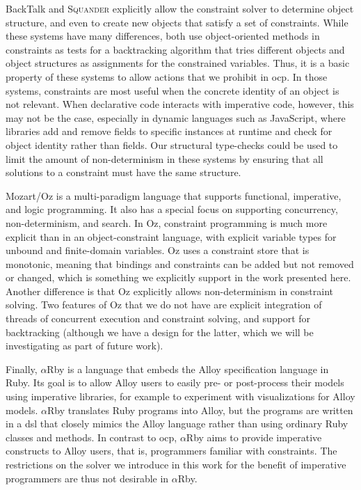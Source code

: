 \documentclass[10pt,reprint]{sigplanconf-preprint}
\newcommand{\ac}[1]{\gls*{#1}}
\begin{document}
BackTalk \cite{pachet1995,roy2000framework} and \textsc{Squander}
\cite{Squander} explicitly allow the constraint solver to determine
object structure, and even to create new objects that satisfy a set of
constraints. While these systems have many differences, both use
object-oriented methods in constraints as tests for a backtracking
algorithm that tries different objects and object structures as
assignments for the constrained variables. Thus, it is a basic
property of these systems to allow actions that we prohibit in
\ac{ocp}. In those systems, constraints are most useful when the
concrete identity of an object is not relevant. When declarative code
interacts with imperative code, however, this may not be the case,
especially in dynamic languages such as JavaScript, where libraries
add and remove fields to specific instances at runtime and check
for object identity rather than fields. Our structural type-checks
could be used to limit the amount of non-determinism in these systems
by ensuring that all solutions to a constraint must have the same
structure.

Mozart/Oz  \cite{van2003logic}  is   a  multi-paradigm  language  that
supports functional, imperative, and  logic programming. It also
has a  special focus  on supporting concurrency,  non-determinism, and
search.  In Oz,  constraint programming is much more  explicit than in
an  object-constraint  language,  with  explicit  variable  types  for
unbound and finite-domain  variables. Oz uses a constraint store that
is monotonic, meaning that bindings  and constraints can be added but
not removed  or changed, which  is something we explicitly  support in
the work  presented here.   Another difference  is that  Oz explicitly
allows non-determinism in constraint solving. Two features of Oz that we
do not have are explicit integration of threads of concurrent
execution and constraint solving, and support for backtracking
(although we have a design for the latter, which we will be
investigating as part of future work).

Finally, $\alpha$Rby \cite{alloyRuby2014} is a language that embeds
the Alloy specification language \cite{DBLP:journals/tosem/Jackson02}
in Ruby. Its goal is to allow Alloy users to easily pre- or
post-process their models using imperative libraries, for example to
experiment with visualizations for Alloy models. $\alpha$Rby
translates Ruby programs into Alloy, but the programs are written in a
\ac{dsl} that closely mimics the Alloy language rather than using
ordinary Ruby classes and methods.  In contrast to \ac{ocp},
$\alpha$Rby aims to provide imperative constructs to Alloy users, that
is, programmers familiar with constraints. The restrictions on the
solver we introduce in this work for the benefit of imperative
programmers are thus not desirable in $\alpha$Rby.
\end{document}
